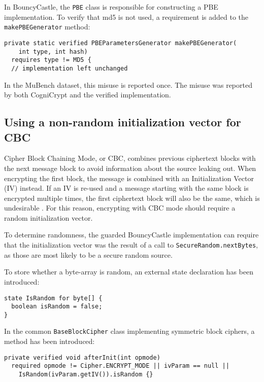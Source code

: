 \documentclass{article}
\begin{document}
In BouncyCastle, the \texttt{PBE} class is responsible for constructing a PBE implementation.
To verify that md5 is not used, a requirement is added to the \texttt{makePBEGenerator} method:

\begin{lstlisting}[style=jGuard]
private static verified PBEParametersGenerator makePBEGenerator(
    int type, int hash)
  requires type != MD5 {
  // implementation left unchanged
\end{lstlisting}

In the MuBench dataset, this misuse is reported once.
The misuse was reported by both CogniCrypt and the verified implementation.

\subsection{Using a non-random initialization vector for CBC}\label{sec:NonRandomIV}

Cipher Block Chaining Mode, or CBC, combines previous ciphertext blocks with the next message block to avoid
information about the source leaking out.
When encrypting the first block, the message is combined with an Initialization Vector (IV) instead.
If an IV is re-used and a message starting with the same block is encrypted multiple times, the first
ciphertext block will also be the same, which is undesirable \cite{UseRandomIV}.
For this reason, encrypting with CBC mode should require a random initialization vector.

To determine randomness, the guarded BouncyCastle implementation can require that the initialization vector
was the result of a call to \texttt{SecureRandom.nextBytes}, as those are most likely to be a secure random source.

To store whether a byte-array is random, an external state declaration has been introduced:

\begin{lstlisting}[style=jGuard]
state IsRandom for byte[] {
  boolean isRandom = false;
}
\end{lstlisting}

In the common \texttt{BaseBlockCipher} class implementing symmetric block ciphers, a method
has been introduced:

\begin{lstlisting}[style=jGuard]
private verified void afterInit(int opmode)
  required opmode != Cipher.ENCRYPT_MODE || ivParam == null ||
    IsRandom(ivParam.getIV()).isRandom {}
\end{lstlisting}
\end{document}
